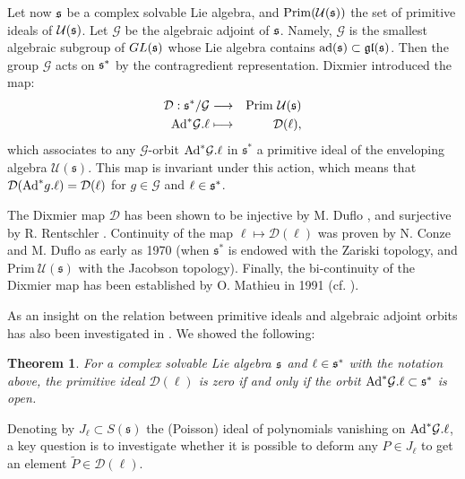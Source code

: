 \documentclass[11pt]{amsart}
\theoremstyle{plain}
\newtheorem{thm}{Theorem}[section]
\theoremstyle{definition}
\theoremstyle{remark}
\newcommand{\wt}{\widetilde}
\begin{document}
	
	Let now $\frak s$ be a complex solvable Lie algebra,
	and $\mathrm{Prim}( \mathcal U(\frak s))$
	the set of primitive ideals of $\mathcal U (\frak s)$.
	Let $\mathcal G$  be the algebraic adjoint of $\frak s$.
	Namely, 
	$\mathcal G$ is the smallest algebraic subgroup of $GL(\frak s)$
	whose Lie algebra contains $\mathrm{ad}(\frak s) \subset \mathfrak{gl}(\frak s)$.
	Then the  group $\mathcal G$ acts on $\frak s^*$ by the contragredient representation.
	Dixmier \cite{D66} introduced the  map:
	\begin{eqnarray*}
		\mathcal D:\mathfrak s^*/\mathcal G&\longrightarrow& \rm{Prim}\ \mathcal U(\mathfrak s)\\
		\hbox{Ad}^*\mathcal G.\ell &\longmapsto & \mathcal D(\ell),
	\end{eqnarray*}
	which associates to any $\mathcal G$-orbit $\hbox{Ad}^*\mathcal G.\ell$ in $\mathfrak s^*$ a primitive ideal of the enveloping algebra $\mathcal U(\mathfrak s)$. 
	This map is invariant under this action,
	which means that 
	$\mathcal D(\hbox{Ad}^*g .\ell) = \mathcal D(\ell)$ 
	for $g \in \mathcal G$ and $\ell \in \frak s^*$.
	
	
	The Dixmier map $\mathcal D$ has been shown to be injective by M. Duflo \cite{Du72}, and surjective by R. Rentschler \cite{R74}. Continuity of the map $\ell\mapsto \mathcal D(\ell)$ was proven by N. Conze and M. Duflo \cite{CD70} as early as 1970 (when $\mathfrak s^*$ is endowed with the Zariski topology, and $\mathrm{Prim}\ \mathcal U(\mathfrak s)$ with the Jacobson topology). Finally, the bi-continuity of the Dixmier map has been established by O. Mathieu in 1991 (cf. \cite{M91}).
	
	
	
	
	
	
	
	
	As an insight on the relation
	between primitive ideals and algebraic adjoint orbits has also been investigated in \cite{Bak-Ishi}.  
	We showed the following:
	
	\vskip 0.4cm
	
	\begin{thm} \label{thm:OpenO}
		{For a complex solvable Lie algebra $\frak s$ and $\ell \in \frak s^*$ with the notation above},
		the primitive ideal $\mathcal D(\ell)$ is zero if and only if
		the orbit $\hbox{Ad}^*\mathcal G.\ell  \subset \frak s^*$ is open.
	\end{thm} 
	Denoting by $J_\ell\subset S(\mathfrak s)$ the (Poisson) ideal of polynomials vanishing on $\rm{Ad}^*\mathcal G.\ell$, a key question is to investigate  whether it is possible  to deform any $P\in J_\ell$ to get an element $\wt P\in \mathcal D(\ell)$.
	
\end{document}
